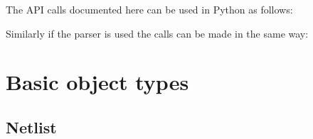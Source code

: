 \documentclass[letterpaper,10pt,english,openany,oneside]{sphinxmanual}
\begin{document}
The API calls documented here can be used in Python as follows:

\begin{sphinxVerbatim}[commandchars=\\\{\}]
   
  
  
\end{sphinxVerbatim}

Similarly if the parser is used the calls can be made in the same way:

\begin{sphinxVerbatim}[commandchars=\\\{\}]
   
  
\end{sphinxVerbatim}

\begin{sphinxVerbatim}[commandchars=\\\{\}]
  
\end{sphinxVerbatim}


\section{Basic object types}
\label{\detokenize{reference/classes/index:basic-object-types}}

\subsection{Netlist}
\label{\detokenize{reference/classes/netlist:netlist}}\label{\detokenize{reference/classes/netlist:id1}}\label{\detokenize{reference/classes/netlist::doc}}
\end{document}
